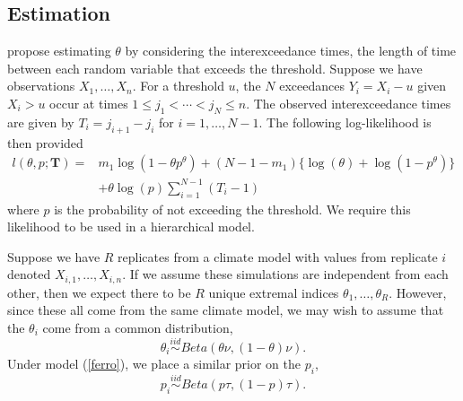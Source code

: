 \documentclass[12pt]{article}
\newcommand{\m}[1]{\mathbf{\bm{#1}}}
\begin{document}
\subsection{Estimation}

\cite{ferro2003inference} propose estimating $\theta$ by considering the interexceedance times, the length of time between each random variable that exceeds the threshold. Suppose we have observations $X_1,\ldots,X_n$. For a threshold $u$, the $N$ exceedances $Y_i=X_i-u$ given $X_i>u$ occur at times $1\leq j_1<\cdots< j_N\leq n$. The observed interexceedance times are given by $T_i=j_{i+1}-j_i$ for $i=1,\ldots,N-1$. The following log-likelihood is then provided
\begin{align}
l(\theta, p; \m{T}) =& m_1\log(1-\theta p^\theta) + (N-1-m_1)\{\log(\theta)+ \log(1-p^\theta)\} \nonumber \\
 &+ \theta\log(p)\sum_{i=1}^{N-1}(T_i-1) \label{ferro}
\end{align}
where $p$ is the probability of not exceeding the threshold. We require this likelihood to be used in a hierarchical model.

Suppose we have $R$ replicates from a climate model with values from replicate $i$ denoted $X_{i,1},\ldots,X_{i,n}$. If we assume these simulations are independent from each other, then we expect there to be $R$ unique extremal indices $\theta_1,\ldots,\theta_R$. However, since these all come from the same climate model, we may wish to assume that the $\theta_i$ come from a common distribution,
\[ \theta_i \overset{iid}\sim Beta\left(\theta\nu, (1-\theta)\nu\right). \]
Under model (\ref{ferro}), we place a similar prior on the $p_i$,
\[ p_i \overset{iid}\sim Beta\left(p\tau, (1-p)\tau\right). \]
\end{document}
